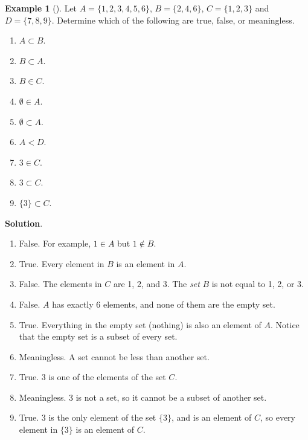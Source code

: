 \documentclass[10pt,]{book}
\theoremstyle{plain}
\theoremstyle{definition}
\theoremstyle{definition}
\newtheorem{example}[theorem]{Example}
\theoremstyle{definition}
\theoremstyle{definition}
\numberwithin{equation}{chapter}
\newcommand{\lt}{<}
\begin{document}
\begin{example}[]\label{example-40}
\hypertarget{p-1483}{}%
Let \(A = \{1, 2, 3, 4, 5, 6\}\), \(B = \{2, 4, 6\}\), \(C = \{1, 2, 3\}\) and \(D = \{7, 8, 9\}\). Determine which of the following are true, false, or meaningless.%
\par
\hypertarget{p-1484}{}%
\leavevmode%
\begin{enumerate}
\item\hypertarget{li-440}{}\(A \subset B\).%
\item\hypertarget{li-441}{}\(B \subset A\).%
\item\hypertarget{li-442}{}\(B \in C\).%
\item\hypertarget{li-443}{}\(\emptyset \in A\).%
\item\hypertarget{li-444}{}\(\emptyset \subset A\).%
\item\hypertarget{li-445}{}\(A \lt  D\).%
\item\hypertarget{li-446}{}\(3 \in C\).%
\item\hypertarget{li-447}{}\(3 \subset C\).%
\item\hypertarget{li-448}{}\(\{3\} \subset C\).%
\end{enumerate}
%
\par\smallskip%
\noindent\textbf{Solution}.\hypertarget{solution-129}{}\quad%
\hypertarget{p-1485}{}%
\leavevmode%
\begin{enumerate}
\item\hypertarget{li-449}{}\hypertarget{p-1486}{}%
False. For example, \(1\in A\) but \(1 \notin B\).%
\item\hypertarget{li-450}{}\hypertarget{p-1487}{}%
True. Every element in \(B\) is an element in \(A\).%
\item\hypertarget{li-451}{}\hypertarget{p-1488}{}%
False. The elements in \(C\) are 1, 2, and 3. The \emph{set} \(B\) is not equal to 1, 2, or 3.%
\item\hypertarget{li-452}{}\hypertarget{p-1489}{}%
False. \(A\) has exactly 6 elements, and none of them are the empty set.%
\item\hypertarget{li-453}{}\hypertarget{p-1490}{}%
True. Everything in the empty set (nothing) is also an element of \(A\). Notice that the empty set is a subset of every set.%
\item\hypertarget{li-454}{}\hypertarget{p-1491}{}%
Meaningless. A set cannot be less than another set.%
\item\hypertarget{li-455}{}\hypertarget{p-1492}{}%
True. \(3\) is one of the elements of the set \(C\).%
\item\hypertarget{li-456}{}\hypertarget{p-1493}{}%
Meaningless. \(3\) is not a set, so it cannot be a subset of another set.%
\item\hypertarget{li-457}{}\hypertarget{p-1494}{}%
True. \(3\) is the only element of the set \(\{3\}\), and is an element of \(C\), so every element in \(\{3\}\) is an element of \(C\).%
\end{enumerate}
%
\end{example}
\end{document}
